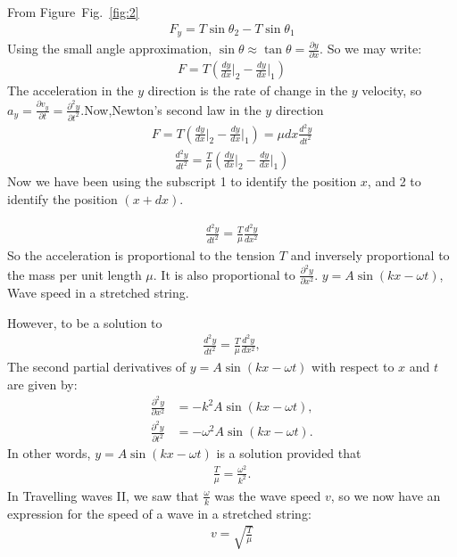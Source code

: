 \documentclass[journal,12pt,twocolumn]{IEEEtran}
\newcommand\figref{Fig.~\ref}
\theoremstyle{remark}
\begin{document}
From Figure~\figref{fig:2}
\begin{align}
F_y = T \sin \theta_2 - T \sin \theta_1 
\end{align}
Using the small angle approximation, $\sin \theta \approx \tan \theta = \frac{\partial y}{\partial x}$. So we may write:
\begin{align}
 F = T\left(\frac{dy}{dx}\Big|_2 - \frac{dy}{dx}\Big|_1\right) 
\end{align}
The acceleration in the $y$ direction is the rate of change in the $y$ velocity, so $a_y = \frac{\partial v_y}{\partial t} = \frac{\partial^2 y}{\partial t^2}$.Now,Newton’s second law in the $y$ direction
\begin{align}
 F = T\left(\frac{dy}{dx}\Big|_2 - \frac{dy}{dx}\Big|_1\right) = \mu dx \frac{d^2y}{dt^2} 
\end{align}
\begin{align}
 \frac{d^2y}{dt^2} = \frac{T}{\mu} \left(\frac{dy}{dx}\Big|_2 - \frac{dy}{dx}\Big|_1\right) 
\end{align}
Now we have been using the subscript 1 to identify the position $x$, and 2 to identify the position $(x+dx)$.
 
\begin{align}
 \frac{d^2y}{dt^2} = \frac{T}{\mu} \frac{d^2y}{dx^2} 
\end{align}
So the acceleration is proportional to the tension $T$ and inversely proportional to the mass per unit length $\mu$. 
It is also proportional to $\frac{\partial^2y}{\partial x^2}$.  $y = A \sin(kx - \omega t)$, Wave speed in a stretched string.

 However, to be a solution to 
\begin{align}
 \frac{d^2y}{dt^2} = \frac{T}{\mu} \frac{d^2y}{dx^2}, 
\end{align}
The second partial derivatives of $y = A\sin(kx - \omega t)$ with respect to $x$ and $t$ are given by:
\begin{align}
\frac{\partial^2 y}{\partial x^2} &= -k^2 A \sin(kx - \omega t), \\
\frac{\partial^2 y}{\partial t^2} &= -\omega^2 A \sin(kx - \omega t).
\end{align} In other words, $y = A \sin(kx - \omega t)$ is a solution provided that
\begin{align}
 \frac{T}{\mu} = \frac{\omega^2}{k^2}. 
\end{align}
In Travelling waves II, we saw that $\frac{\omega}{k}$ was the wave speed $v$, so we now have an expression for the speed of a wave in a stretched string:
\begin{align}
 v = \sqrt{\frac{T}{\mu}} 
\end{align}
\end{document}
